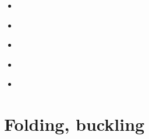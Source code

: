 \begin{scriptsize}
\begin{itemize}
\item[\twothousandone] 
\textcite{dohe01} 
\item[\twothousandseven] 
\textcite{hecb07} 
\item[\twothousandnine] 
\textcite{agyj09} 
\item[\twothousandthirteen] 
\textcite{arbi13} \\
\textcite{krcu13} 
\item[\twothousandtwentytwo] 
\textcite{wakw22}\\ 
\textcite{yadb22} 
\end{itemize}
\end{scriptsize}


\section{Folding, buckling} 



